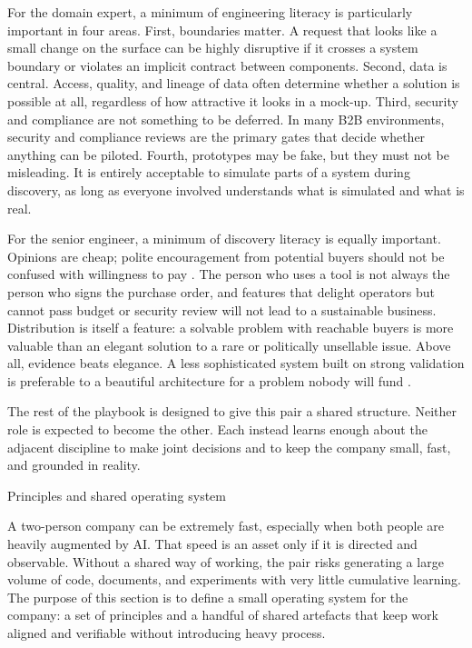 \documentclass[10pt, a4paper, twocolumn]{article} %
\makeatletter
\let\orig@section\section %
\renewcommand{\section}{%
  \@ifstar{\orig@section*}{\unnumberedsteppingsection}%
}
\newcommand{\unnumberedsteppingsection}[1]{%
  \refstepcounter{section}%
  \orig@section*{#1}%
}
\makeatother
\begin{document}
For the domain expert, a minimum of engineering literacy is particularly important in four areas. First, boundaries matter. A request that looks like a small change on the surface can be highly disruptive if it crosses a system boundary or violates an implicit contract between components. Second, data is central. Access, quality, and lineage of data often determine whether a solution is possible at all, regardless of how attractive it looks in a mock-up. Third, security and compliance are not something to be deferred. In many B2B environments, security and compliance reviews are the primary gates that decide whether anything can be piloted. Fourth, prototypes may be fake, but they must not be misleading. It is entirely acceptable to simulate parts of a system during discovery, as long as everyone involved understands what is simulated and what is real.

For the senior engineer, a minimum of discovery literacy is equally important. Opinions are cheap; polite encouragement from potential buyers should not be confused with willingness to pay \citep{fitzpatrick2013mom}. The person who uses a tool is not always the person who signs the purchase order, and features that delight operators but cannot pass budget or security review will not lead to a sustainable business. Distribution is itself a feature: a solvable problem with reachable buyers is more valuable than an elegant solution to a rare or politically unsellable issue. Above all, evidence beats elegance. A less sophisticated system built on strong validation is preferable to a beautiful architecture for a problem nobody will fund \citep{ries2011lean,bland2019testing}.

The rest of the playbook is designed to give this pair a shared structure. Neither role is expected to become the other. Each instead learns enough about the adjacent discipline to make joint decisions and to keep the company small, fast, and grounded in reality.


\clearpage

\section{Principles and shared operating system}

A two-person company can be extremely fast, especially when both people are heavily augmented by AI. That speed is an asset only if it is directed and observable. Without a shared way of working, the pair risks generating a large volume of code, documents, and experiments with very little cumulative learning. The purpose of this section is to define a small operating system for the company: a set of principles and a handful of shared artefacts that keep work aligned and verifiable without introducing heavy process.
\end{document}
